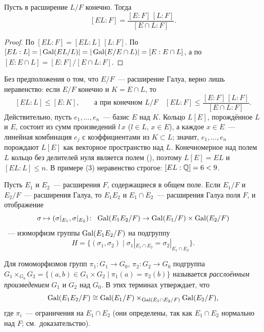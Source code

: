 \begin{corollary}[3.20]
Пусть в  расширение $L/F$ конечно. Тогда
\[
[EL:F]=\frac{[E:F]\,[L:F]}{[E\cap L:F]} .
\]
\end{corollary}

\begin{proof}
По  $[EL:F]=[EL:L]\,[L:F]$. По  $[EL:L]=|\operatorname{Gal}(EL/L)|=|\operatorname{Gal}(E/E\cap L)|=[E:E\cap L]$, а по 
$[E:E\cap L]=[E:F]/[E\cap L:F]$.
\end{proof}

\begin{remark}[3.20a]
Без предположения о том, что $E/F$~--- расширение Галуа, верно лишь неравенство: если $E/F$ конечно и $K=E\cap L$, то
\[
[EL:L]\le[E:K],\qquad\text{а при конечном }L/F\quad [EL:F]\le\frac{[E:F]\,[L:F]}{[E\cap L:F]} .
\]
Действительно, пусть $e_1,\dots,e_n$~--- базис $E$ над $K$. Кольцо $L[E]$, порождённое $L$ и $E$, состоит из сумм
произведений $l\,x$ ($l\in L$, $x\in E$), а каждое $x\in E$~--- линейная комбинация $e_j$ с коэффициентами из $K\subset L$;
значит, $e_1,\dots,e_n$ порождают $L[E]$ как векторное пространство над $L$. Конечномерное над полем $L$ кольцо без делителей
нуля является полем (), поэтому $L[E]=EL$ и $[EL:L]\le n$. В примере (3) неравенство строгое:
$[EL:\mathbb Q]=6<9$.
\end{remark}

\begin{proposition}[3.21]
Пусть $E_1$ и $E_2$~--- расширения $F$, содержащиеся в общем поле. Если $E_1/F$ и $E_2/F$~--- расширения Галуа, то $E_1E_2$
и $E_1\cap E_2$~--- расширения Галуа поля $F$, и отображение
\[
\sigma\mapsto(\sigma|_{E_1},\sigma|_{E_2})\colon\ \Gal(E_1E_2/F)\to\Gal(E_1/F)\times\Gal(E_2/F)
\]
~--- изоморфизм группы $\operatorname{Gal}(E_1E_2/F)$ на подгруппу
\[
H=\{(\sigma_1,\sigma_2)\mid\sigma_1|_{E_1\cap E_2}=\sigma_2|_{E_1\cap E_2}\}.
\]
\end{proposition}

Для гомоморфизмов групп $\pi_1\colon G_1\to G_0$, $\pi_2\colon G_2\to G_0$ подгруппа
$G_1\times_{G_0}G_2=\{(a,b)\in G_1\times G_2\mid\pi_1(a)=\pi_2(b)\}$ называется \emph{расслоённым произведением} $G_1$ и $G_2$
над $G_0$. В этих терминах  утверждает, что
\[
\operatorname{Gal}(E_1E_2/F)\cong\operatorname{Gal}(E_1/F)\times_{\operatorname{Gal}(E_1\cap E_2/F)}\operatorname{Gal}(E_2/F),
\]
где $\pi_i$~--- ограничения на $E_1\cap E_2$ (они определены, так как $E_1\cap E_2$ нормально над $F$; см.\ доказательство).

